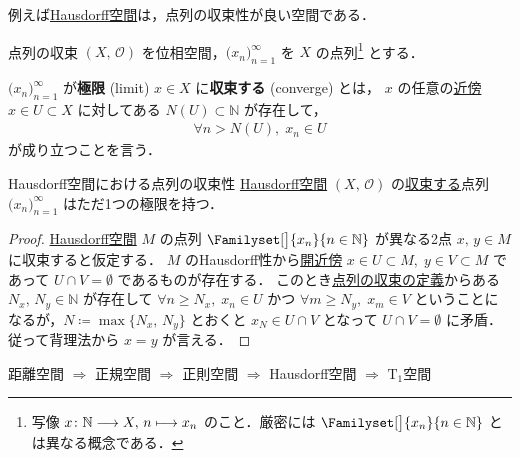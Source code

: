 \documentclass[geometry_main]{subfiles}
\begin{document}
例えば\hyperref[def:separation]{Hausdorff空間}は，点列の収束性が良い空間である．
\begin{mydef}[label=def:sequence-convergence]{点列の収束}
	$(X,\, \mathscr{O})$ を位相空間，$\bigl(x_n\bigr)_{n=1}^\infty$ を $X$ の点列\footnote{写像 $x \colon \mathbb{N} \longrightarrow X,\, n \longmapsto x_n$ のこと．厳密には $\Familyset[\big]{x_n}{n \in \mathbb{N}}$ とは異なる概念である．} とする．
	
	$\bigl(x_n\bigr)_{n=1}^\infty$ が\textbf{極限} (limit) $x \in X$ に\textbf{収束する} (converge) とは，
	$x$ の任意の\hyperref[def:neighborhood]{近傍} $x \in U \subset X$ に対してある $N(U) \subset \mathbb{N}$ が存在して，
	\begin{align}
		\forall n > N(U),\; x_n \in U
	\end{align}
	が成り立つことを言う．
\end{mydef}

\begin{myprop}[label=prop:Hausdorff-sequence-converge]{Hausdorff空間における点列の収束性}
	\hyperref[def:separation]{Hausdorff空間} $(X,\, \mathscr{O})$ の\hyperref[def:sequence-convergence]{収束する}点列 $\bigl(x_n\bigr)_{n=1}^\infty$ はただ1つの極限を持つ．
\end{myprop}

\begin{proof}
	\hyperref[def:separation]{Hausdorff空間} $M$ の点列 $\Familyset[\big]{x_n}{n \in \mathbb{N}}$ が異なる2点 $x,\, y \in M$ に収束すると仮定する．
	$M$ のHausdorff性から\hyperref[def:neighborhood]{開近傍} $x \in U \subset M,\; y \in V \subset M$ であって $U \cap V = \emptyset$ であるものが存在する．
	このとき\hyperref[def:sequence-convergence]{点列の収束の定義}からある $N_x,\, N_y \in \mathbb{N}$ が存在して $\forall n \ge N_x,\; x_n \in U$ かつ $\forall m \ge N_y,\; x_m \in V$ ということになるが，$N \coloneqq \max \{N_x,\, N_y\}$ とおくと $x_N \in U \cap V$ となって $U \cap V = \emptyset$ に矛盾．従って背理法から $x = y$ が言える．
\end{proof}


\begin{mytheo}[label=thm:separation-basic]{}
	距離空間 $\Rightarrow$ 正規空間 $\Rightarrow$ 正則空間 $\Rightarrow$ Hausdorff空間 $\Rightarrow$ $\mathrm{T}_1$空間 
\end{mytheo}


\end{document}
